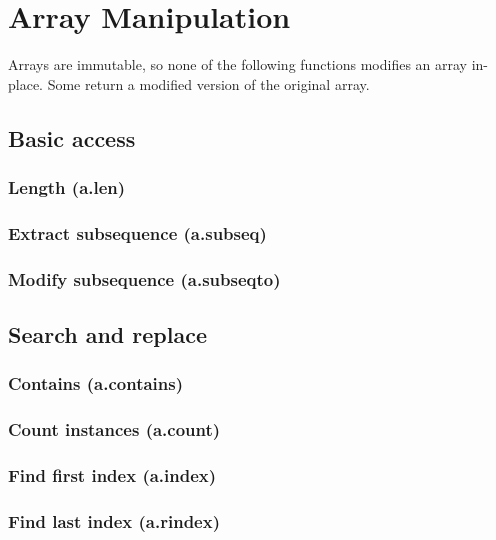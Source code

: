 \documentclass{article}
\theoremstyle{definition}
\begin{document}
\section{Array Manipulation}

Arrays are immutable, so none of the following functions modifies an array in-place.  Some return a modified version of the original array.

\subsection{Basic access}

\subsubsection{Length (a.len)}

\subsubsection{Extract subsequence (a.subseq)}

\subsubsection{Modify subsequence (a.subseqto)}

\subsection{Search and replace}

\subsubsection{Contains (a.contains)}

\subsubsection{Count instances (a.count)}

\subsubsection{Find first index (a.index)}

\subsubsection{Find last index (a.rindex)}
\end{document}
